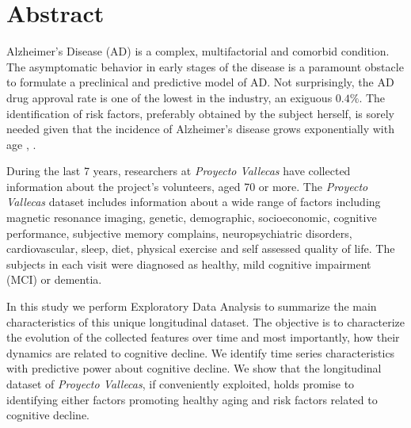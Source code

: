 \documentclass[11pt]{article}
\theoremstyle{definition}
\theoremstyle{remark}
\begin{document}


\section*{Abstract}
Alzheimer's Disease (AD) is a complex, multifactorial and comorbid condition. The asymptomatic behavior in early stages of the disease is a paramount obstacle to formulate a preclinical and predictive model of AD. Not surprisingly, the AD drug approval rate is one of the lowest in the industry, an exiguous $0.4\%$. The identification of risk factors, preferably obtained by the subject herself, is sorely needed given that the incidence of Alzheimer’s disease grows exponentially with age \cite{ferri2005global}, \cite{ganguli2011age}. 

During the last 7 years, researchers at \emph{Proyecto Vallecas} have collected information about the project's volunteers, aged 70 or more. The \emph{Proyecto Vallecas} dataset includes information about a wide range of factors including magnetic resonance imaging, genetic, demographic, socioeconomic, cognitive performance, subjective memory complains, neuropsychiatric disorders, cardiovascular, sleep, diet, physical exercise and self assessed quality of life. The subjects in each visit were diagnosed as healthy, mild cognitive impairment (MCI) or dementia. 

In this study we perform Exploratory Data Analysis to summarize the main characteristics of this unique longitudinal dataset. The objective is to characterize the evolution of the collected features over time and most importantly, how their dynamics are related to cognitive decline. 
We identify time series characteristics with predictive power about cognitive decline. We show that the longitudinal dataset of \emph{Proyecto Vallecas}, if conveniently exploited, holds promise to identifying either factors promoting healthy aging and risk factors related to cognitive decline. 
 
\end{document}
